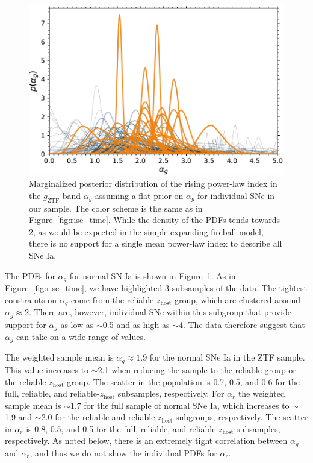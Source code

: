\documentclass[twocolumn]{./aastex63}
\newcommand{\gztf}{$g_\mathrm{ZTF}$}
\begin{document}
\begin{figure}
    \centering
    \includegraphics[width=1\linewidth]{./figures/alpha_g.pdf}
    \caption{Marginalized posterior distribution of the rising power-law
    index in the \gztf-band $\alpha_g$ assuming a flat prior on $\alpha_g$
    for individual SNe in our sample. The color scheme is the same as in
    Figure~\ref{fig:rise_time}. While the
    density of the PDFs tends towards 2, as would be expected in the simple
    expanding fireball model, there is no support for a single mean power-law
    index to describe all SNe Ia.}
    \label{fig:alpha_rise}
\end{figure}

The PDFs for $\alpha_g$ for normal SN Ia is shown in
Figure~\ref{fig:alpha_rise}. As in Figure~\ref{fig:rise_time}, we have
highlighted 3 subsamples of the data. The tightest constraints on $\alpha_g$
come from the reliable-$z_\mathrm{host}$ group, which are clustered around
$\alpha_g \approx 2$. There are, however, individual SNe within this subgroup
that provide support for $\alpha_g$ as low as $\sim$0.5 and as high as
$\sim$4. The data therefore suggest that $\alpha_g$ can take on a wide range
of values.

The weighted sample mean is $\alpha_g \approx 1.9$ for the normal SNe Ia in
the ZTF sample. This value increases to $\sim$2.1 when reducing the sample to
the reliable group or the reliable-$z_\mathrm{host}$ group. The scatter in the
population is 0.7, 0.5, and 0.6 for the full, reliable, and
reliable-$z_\mathrm{host}$ subsamples, respectively. For $\alpha_r$ the
weighted sample mean is $\sim$1.7 for the full sample of normal SNe Ia, which
increases to $\sim$1.9 and $\sim$2.0 for the reliable and
reliable-$z_\mathrm{host}$ subgroups, respectively. The scatter in $\alpha_r$
is 0.8, 0.5, and 0.5 for the full, reliable, and reliable-$z_\mathrm{host}$
subsamples, respectively. As noted below, there is an extremely tight
correlation between $\alpha_g$ and $\alpha_r$, and thus we do not show the
individual PDFs for $\alpha_r$.
\end{document}
